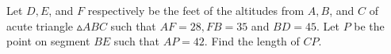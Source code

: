 Let $D, E$, and $F$ respectively be the feet of the altitudes from $A, B$, and $C$ of acute triangle $\vartriangle ABC$ such that $AF = 28, FB = 35$ and $BD = 45$. Let $P$ be the point on segment $BE$ such that $AP = 42$. Find the length of $CP$.